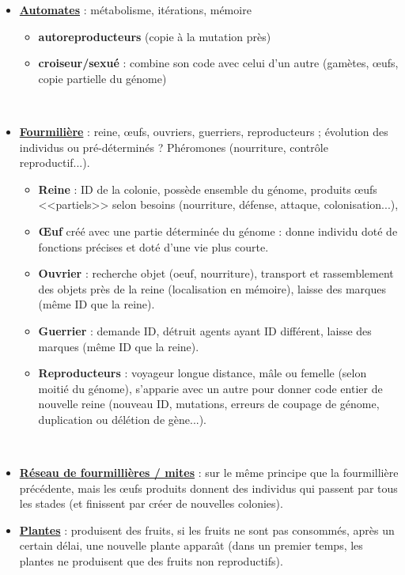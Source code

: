 \documentclass[11pt,twoside,a4paper]{article}
\begin{document}
\begin{itemize}
	\item \underline{\textbf{Automates}} : m{\'e}tabolisme, it{\'e}rations, m{\'e}moire
	\begin{itemize}
		\item \textbf{autoreproducteurs} (copie {\`a} la mutation pr{\`e}s)
		\item \textbf{croiseur/sexu{\'e}} : combine son code avec celui d'un autre (gam{\`e}tes, \oe ufs, copie partielle du g{\'e}nome)
	\end{itemize}~\\
	
	\item \underline{\textbf{Fourmili{\`e}re}} : reine, \oe ufs, ouvriers, guerriers, reproducteurs ; {\'e}volution des individus ou pr{\'e}-d{\'e}termin{\'e}s ? Ph{\'e}romones (nourriture, contr{\^o}le reproductif...). 
	\begin{itemize}
		\item \textbf{Reine} : ID de la colonie, poss{\`e}de ensemble du g{\'e}nome, produits \oe ufs <<partiels>> selon besoins (nourriture, d{\'e}fense, attaque, colonisation...), 
		\item \textbf{\OE uf} cr{\'e}{\'e} avec une partie d{\'e}termin{\'e}e du g{\'e}nome : donne individu dot{\'e} de fonctions pr{\'e}cises et dot{\'e} d'une vie plus courte. 
		\item \textbf{Ouvrier} : recherche objet (oeuf, nourriture), transport et rassemblement des objets pr{\`e}s de la reine (localisation en m{\'e}moire), laisse des marques (m{\^e}me ID que la reine). 
		\item \textbf{Guerrier} : demande ID, d{\'e}truit agents ayant ID diff{\'e}rent, laisse des marques (m{\^e}me ID que la reine). 
		\item \textbf{Reproducteurs} : voyageur longue distance, m{\^a}le ou femelle (selon moiti{\'e} du g{\'e}nome), s'apparie avec un autre pour donner code entier de nouvelle reine (nouveau ID, mutations, erreurs de coupage de g{\'e}nome, duplication ou d{\'e}l{\'e}tion de g{\`e}ne...). 
	\end{itemize}~\\
	
	\item \underline{\textbf{R{\'e}seau de fourmilli{\`e}res / mites}} : sur le m{\^e}me principe que la fourmilli{\`e}re pr{\'e}c{\'e}dente, mais les \oe ufs produits donnent des individus qui passent par tous les stades (et finissent par cr{\'e}er de nouvelles colonies).~\\

	\item \underline{\textbf{Plantes}} : produisent des fruits, si les fruits ne sont pas consomm{\'e}s, apr{\`e}s un certain d{\'e}lai, une nouvelle plante appara{\^\i}t (dans un premier temps, les plantes ne produisent que des fruits non reproductifs). 
\end{itemize}
\end{document}
